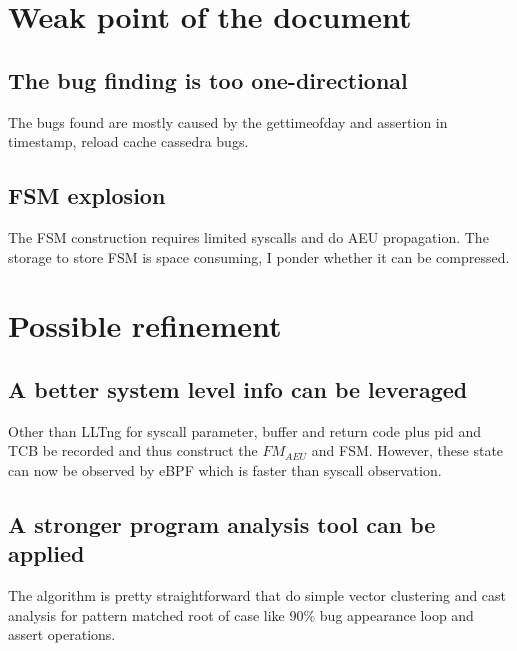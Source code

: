 \documentclass[acmlarge]{acmart}
\begin{document}
\section{Weak point of the document}
\subsection{The bug finding is too one-directional}
The bugs found are mostly caused by the gettimeofday and assertion in timestamp, reload cache cassedra bugs.
\subsection{FSM explosion}
The FSM construction requires limited syscalls and do AEU propagation. The storage to store FSM is space consuming, I ponder whether it can be compressed.
\section{Possible refinement}
\subsection{A better system level info can be leveraged}
Other than LLTng for syscall parameter, buffer and return code plus pid and TCB be recorded and thus construct the $FM_{AEU}$ and FSM. However, these state can now be observed by eBPF which is faster than syscall observation.
\subsection{A stronger program analysis tool can be applied}
The algorithm is pretty straightforward that do simple vector clustering and cast analysis for pattern matched root of case like 90\% bug appearance loop and assert operations.


\end{document}
